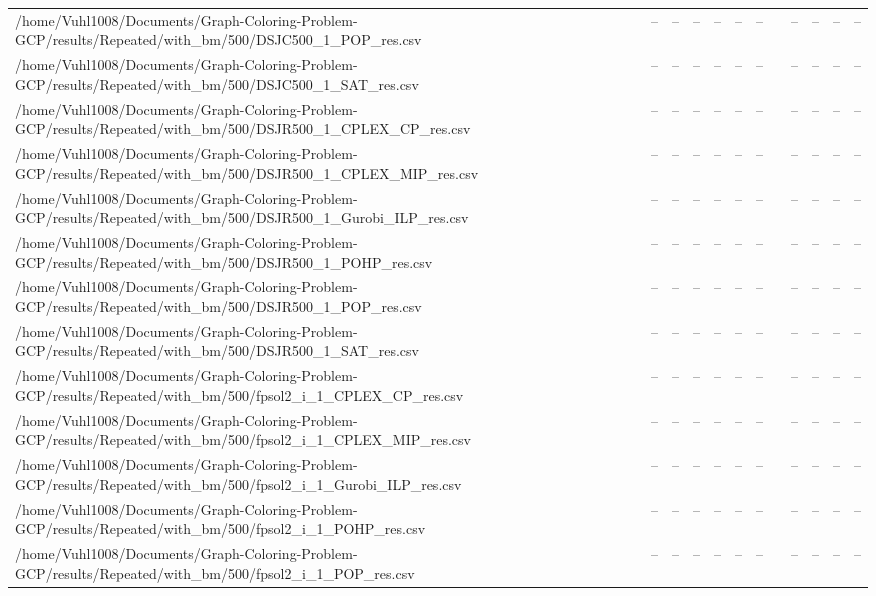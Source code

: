 \begin{table}[htbp]
\begin{tabular}{llllllllllll}
/home/Vuhl1008/Documents/Graph-Coloring-Problem-GCP/results/Repeated/with\_bm/500/DSJC500\_1\_POP\_res.csv & -- & -- & -- & -- & -- & -- & {} & -- & -- & -- & -- \\
/home/Vuhl1008/Documents/Graph-Coloring-Problem-GCP/results/Repeated/with\_bm/500/DSJC500\_1\_SAT\_res.csv & -- & -- & -- & -- & -- & -- & {} & -- & -- & -- & -- \\
/home/Vuhl1008/Documents/Graph-Coloring-Problem-GCP/results/Repeated/with\_bm/500/DSJR500\_1\_CPLEX\_CP\_res.csv & -- & -- & -- & -- & -- & -- & {} & -- & -- & -- & -- \\
/home/Vuhl1008/Documents/Graph-Coloring-Problem-GCP/results/Repeated/with\_bm/500/DSJR500\_1\_CPLEX\_MIP\_res.csv & -- & -- & -- & -- & -- & -- & {} & -- & -- & -- & -- \\
/home/Vuhl1008/Documents/Graph-Coloring-Problem-GCP/results/Repeated/with\_bm/500/DSJR500\_1\_Gurobi\_ILP\_res.csv & -- & -- & -- & -- & -- & -- & {} & -- & -- & -- & -- \\
/home/Vuhl1008/Documents/Graph-Coloring-Problem-GCP/results/Repeated/with\_bm/500/DSJR500\_1\_POHP\_res.csv & -- & -- & -- & -- & -- & -- & {} & -- & -- & -- & -- \\
/home/Vuhl1008/Documents/Graph-Coloring-Problem-GCP/results/Repeated/with\_bm/500/DSJR500\_1\_POP\_res.csv & -- & -- & -- & -- & -- & -- & {} & -- & -- & -- & -- \\
/home/Vuhl1008/Documents/Graph-Coloring-Problem-GCP/results/Repeated/with\_bm/500/DSJR500\_1\_SAT\_res.csv & -- & -- & -- & -- & -- & -- & {} & -- & -- & -- & -- \\
/home/Vuhl1008/Documents/Graph-Coloring-Problem-GCP/results/Repeated/with\_bm/500/fpsol2\_i\_1\_CPLEX\_CP\_res.csv & -- & -- & -- & -- & -- & -- & {} & -- & -- & -- & -- \\
/home/Vuhl1008/Documents/Graph-Coloring-Problem-GCP/results/Repeated/with\_bm/500/fpsol2\_i\_1\_CPLEX\_MIP\_res.csv & -- & -- & -- & -- & -- & -- & {} & -- & -- & -- & -- \\
/home/Vuhl1008/Documents/Graph-Coloring-Problem-GCP/results/Repeated/with\_bm/500/fpsol2\_i\_1\_Gurobi\_ILP\_res.csv & -- & -- & -- & -- & -- & -- & {} & -- & -- & -- & -- \\
/home/Vuhl1008/Documents/Graph-Coloring-Problem-GCP/results/Repeated/with\_bm/500/fpsol2\_i\_1\_POHP\_res.csv & -- & -- & -- & -- & -- & -- & {} & -- & -- & -- & -- \\
/home/Vuhl1008/Documents/Graph-Coloring-Problem-GCP/results/Repeated/with\_bm/500/fpsol2\_i\_1\_POP\_res.csv & -- & -- & -- & -- & -- & -- & {} & -- & -- & -- & -- \\

\end{tabular}
\end{table}
